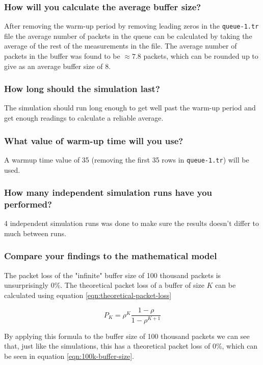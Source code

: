 \documentclass{article}
\begin{document}
    \subsubsection*{How will you calculate the average buffer size?}
    After removing the warm-up period by removing leading zeros in the \verb|queue-1.tr| file the average number of packets in the queue can be calculated by taking the average of the rest of the measurements in the file. The average number of packets in the buffer was found to be $\approx7.8$ packets, which can be rounded up to give as an average buffer size of 8.

    \subsubsection*{How long should the simulation last?}
    The simulation should run long enough to get well past the warm-up period and get enough readings to calculate a reliable average. 

    \subsubsection*{What value of warm-up time will you use?}
    A warmup time value of 35 (removing the first 35 rows in \verb|queue-1.tr|) will be used.

    \subsubsection*{How many independent simulation runs have you performed?}
    4 independent simulation runs was done to make sure the results doesn't differ to much between runs.

    \subsubsection*{Compare your findings to the mathematical model}
    The packet loss of the "infinite" buffer size of 100 thousand packets is unsurprisingly 0\%. The theoretical packet loss of a buffer of size $K$ can be calculated using equation \ref{eqn:theoretical-packet-loss} 
    
    \begin{equation}
    \label{eqn:theoretical-packet-loss}
        P_K = \rho^K\frac{1-\rho}{1-\rho^{K+1}}
    \end{equation}
    
    By applying this formula to the buffer size of 100 thousand packets we can see that, just like the simulations, this has a theoretical packet loss of 0\%, which can be seen in equation \ref{eqn:100k-buffer-size}.
\end{document}
